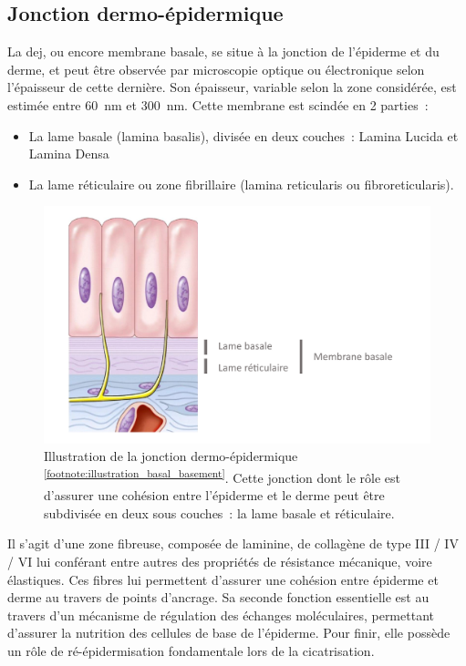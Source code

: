 \subsection{Jonction dermo-épidermique}
La \gls{dej}, ou encore membrane basale, se situe à la jonction de l’épiderme et du derme, et peut être observée par microscopie optique ou électronique selon l’épaisseur de cette dernière. Son épaisseur, variable selon la zone considérée, est estimée entre \SI{60}{\nano\metre} et \SI{300}{\nano\metre}. 
Cette membrane est scindée en 2 parties~:
\begin{itemize}
\item La lame basale (lamina basalis), divisée en deux couches~: Lamina Lucida et Lamina Densa
\item La lame réticulaire ou zone fibrillaire (lamina reticularis ou fibroreticularis).
\end{itemize}\par
\begin{figure}[H]
    \centering
    \includegraphics[width=\linewidth]{contents/chapter_1/resources/illustration_basal_basement.pdf}
    \caption{Illustration de la jonction dermo-épidermique \textsuperscript{\ref{footnote:illustration_basal_basement}}. Cette jonction dont le rôle est d'assurer une cohésion entre l'épiderme et le derme peut être subdivisée en deux sous couches~: la lame basale et réticulaire.}
    \label{fig:illustration_basal_basement}
\end{figure}\par

\addtocounter{footnote}{1}

Il s’agit d’une zone fibreuse, composée de laminine, de collagène de type III / IV / VI lui conférant entre autres des propriétés de résistance mécanique, voire élastiques. Ces fibres lui permettent d’assurer une cohésion entre épiderme et derme au travers de points d’ancrage. Sa seconde fonction essentielle est au travers d’un mécanisme de régulation des échanges moléculaires, permettant d’assurer la nutrition des cellules de base de l’épiderme. Pour finir, elle possède un rôle de ré-épidermisation fondamentale lors de la cicatrisation.\par
\clearpage

